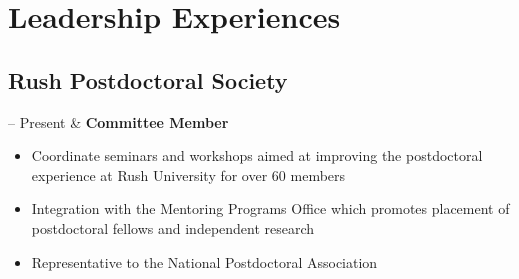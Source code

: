 \documentclass[10pt, letterpaper]{article}
\newcommand{\Duration}[2]{\fontsize{9pt}{0}\selectfont #1 -- #2}
\newcommand{\Ongoing}{Present} %
\newcommand{\Twoline}[2]{\textbf{#1}\newline  #2}
\begin{document}
\section{Leadership Experiences}
\subsection{Rush Postdoctoral Society}
\begin{EntriesTable}

\Duration{2021}{\Ongoing} &
\Twoline{Committee Member}
{
\vspace{-0.4cm}
\begin{itemize}

\item Coordinate seminars and workshops aimed at improving the postdoctoral experience at Rush University for over 60 members

\item Integration with the Mentoring Programs Office which promotes placement of postdoctoral fellows and independent research 

\item Representative to the National Postdoctoral Association
\end{itemize}
}
\end{EntriesTable}

\vspace{-1cm}
\end{document}
